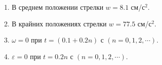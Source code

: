 \begin{enumerate}
\item В среднем положении стрелки $w = 8.1$ см/с$^2$.
\item В крайних положениях стрелки $w = 77.5$ см/с$^2$.
\item $\omega = 0$ при $t = (0.1 + 0.2n)$ с $(n = 0, 1, 2, \cdots)$.
\item $\varepsilon = 0$ при $t = 0.2n$ с $(n = 0, 1, 2, \cdots)$.
\end{enumerate}
